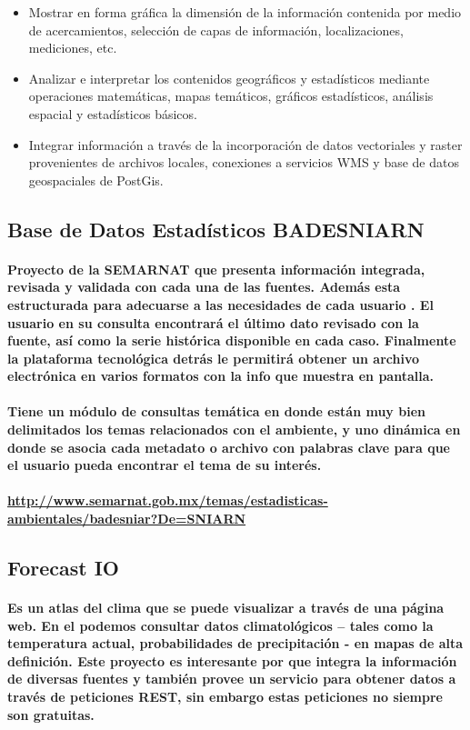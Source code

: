     \begin{itemize}
      \item {Mostrar en forma gráfica la dimensión de la información contenida por medio de acercamientos, selección de capas de información, localizaciones, mediciones, etc.}
      \item {Analizar e interpretar los contenidos geográficos y estadísticos mediante operaciones matemáticas, mapas temáticos, gráficos estadísticos, análisis espacial y estadísticos básicos.}
      \item {Integrar información a través de la incorporación de datos vectoriales y raster provenientes de archivos locales, conexiones a servicios WMS y base de datos geospaciales de PostGis.}
    \end{itemize}

    \subsection {Base de Datos Estadísticos BADESNIARN}
    \paragraph {Proyecto de la SEMARNAT que presenta información integrada, revisada y validada con cada una de las fuentes. Además esta estructurada para adecuarse a las necesidades de cada usuario . El usuario en su consulta encontrará el último dato revisado con la fuente, así como la serie histórica disponible en cada caso. Finalmente la plataforma tecnológica detrás le permitirá obtener un archivo electrónica en varios formatos con la info que muestra en pantalla.}

    \paragraph { Tiene un módulo de consultas temática en donde están muy bien delimitados los temas relacionados con el ambiente, y uno dinámica en donde se asocia cada metadato o archivo con palabras clave para que el usuario pueda encontrar el tema de su interés.}

    \paragraph {
      \sloppy
      \url{http://www.semarnat.gob.mx/temas/estadisticas-ambientales/badesniar?De=SNIARN}
    }

    \subsection {Forecast IO}
    \paragraph {Es un atlas del clima que se puede visualizar a través de una página web. En el podemos consultar datos climatológicos – tales como la temperatura actual, probabilidades de precipitación - en mapas de alta definición. Este proyecto es interesante por que integra la información de diversas fuentes y también provee un servicio para obtener datos a través de peticiones REST, sin embargo estas peticiones no siempre son gratuitas.}
